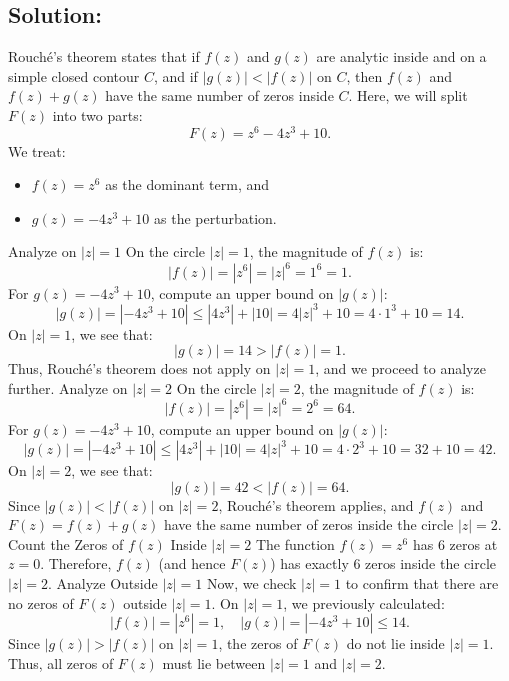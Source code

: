 \documentclass[12pt]{article}
\begin{document}
    \subsection*{Solution:}
        Rouché's theorem states that if \(f(z)\) and \(g(z)\) are analytic inside and on a simple closed contour \(C\), and if \(|g(z)| < |f(z)|\) on \(C\), then \(f(z)\) and \(f(z) + g(z)\) have the same number of zeros inside \(C\).
        Here, we will split \(F(z)\) into two parts:
        \[
        F(z) = z^6 - 4z^3 + 10.
        \]
        We treat:
        \begin{itemize}
            \item \(f(z) = z^6\) as the dominant term, and
            \item \(g(z) = -4z^3 + 10\) as the perturbation.
        \end{itemize}
        Analyze on \(|z| = 1\)
        On the circle \(|z| = 1\), the magnitude of \(f(z)\) is:
        \[
        |f(z)| = |z^6| = |z|^6 = 1^6 = 1.
        \]
        For \(g(z) = -4z^3 + 10\), compute an upper bound on \(|g(z)|\):
        \[
        |g(z)| = |-4z^3 + 10| \leq |4z^3| + |10| = 4|z|^3 + 10 = 4 \cdot 1^3 + 10 = 14.
        \]
        On \(|z| = 1\), we see that:
        \[
        |g(z)| = 14 > |f(z)| = 1.
        \]
        Thus, Rouché's theorem does not apply on \(|z| = 1\), and we proceed to analyze further.
        Analyze on \(|z| = 2\)
        On the circle \(|z| = 2\), the magnitude of \(f(z)\) is:
        \[
        |f(z)| = |z^6| = |z|^6 = 2^6 = 64.
        \]
        For \(g(z) = -4z^3 + 10\), compute an upper bound on \(|g(z)|\):
        \[
        |g(z)| = |-4z^3 + 10| \leq |4z^3| + |10| = 4|z|^3 + 10 = 4 \cdot 2^3 + 10 = 32 + 10 = 42.
        \]
        On \(|z| = 2\), we see that:
        \[
        |g(z)| = 42 < |f(z)| = 64.
        \]
        Since \(|g(z)| < |f(z)|\) on \(|z| = 2\), Rouché's theorem applies, and \(f(z)\) and \(F(z) = f(z) + g(z)\) have the same number of zeros inside the circle \(|z| = 2\).
        Count the Zeros of \(f(z)\) Inside \(|z| = 2\)
        The function \(f(z) = z^6\) has 6 zeros at \(z = 0\). Therefore, \(f(z)\) (and hence \(F(z)\)) has exactly 6 zeros inside the circle \(|z| = 2\).
        Analyze Outside \(|z| = 1\)
        Now, we check \(|z| = 1\) to confirm that there are no zeros of \(F(z)\) outside \(|z| = 1\).
        On \(|z| = 1\), we previously calculated:
        \[
        |f(z)| = |z^6| = 1, \quad |g(z)| = |-4z^3 + 10| \leq 14.
        \]
        Since \(|g(z)| > |f(z)|\) on \(|z| = 1\), the zeros of \(F(z)\) do not lie inside \(|z| = 1\). Thus, all zeros of \(F(z)\) must lie between \(|z| = 1\) and \(|z| = 2\).
\end{document}
